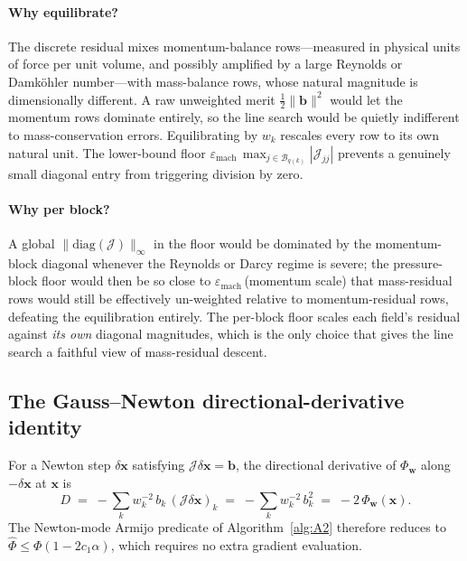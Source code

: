 \documentclass{article}
\begin{document}
\paragraph{Why equilibrate?}  The discrete residual mixes momentum-balance
rows---measured in physical units of force per unit volume, and possibly
amplified by a large Reynolds or Damk\"ohler number---with mass-balance
rows, whose natural magnitude is dimensionally different. A raw unweighted
merit $\tfrac{1}{2}\|\boldsymbol{b}\|^2$ would let the momentum rows
dominate entirely, so the line search would be quietly indifferent to
mass-conservation errors. Equilibrating by $w_k$ rescales every row to
its own natural unit. The lower-bound floor
$\varepsilon_{\mathrm{mach}}\,\max_{j \in \mathcal{B}_{q(k)}} |\mathcal{J}_{jj}|$
prevents a genuinely small diagonal entry from triggering division by
zero.

\paragraph{Why per block?}  A global $\|\mathrm{diag}(\mathcal{J})\|_\infty$
in the floor would be dominated by the momentum-block diagonal whenever
the Reynolds or Darcy regime is severe; the pressure-block floor
would then be so close to $\varepsilon_{\mathrm{mach}}\,$(momentum scale)
that mass-residual rows would still be effectively un-weighted relative
to momentum-residual rows, defeating the equilibration entirely. The
per-block floor scales each field's residual against \emph{its own}
diagonal magnitudes, which is the only choice that gives the line search
a faithful view of mass-residual descent.

\subsection{The Gauss--Newton directional-derivative identity}
\label{sec:dir-deriv}

For a Newton step $\delta\boldsymbol{x}$ satisfying
$\mathcal{J}\delta\boldsymbol{x} = \boldsymbol{b}$, the directional
derivative of $\Phi_{\boldsymbol{w}}$ along $-\delta\boldsymbol{x}$ at
$\boldsymbol{x}$ is
\begin{equation}
    \label{eq:dir-deriv}
    D \;=\; -\sum_k w_k^{-2}\, b_k\,(\mathcal{J}\delta\boldsymbol{x})_k
        \;=\; -\sum_k w_k^{-2}\, b_k^2
        \;=\; -2\,\Phi_{\boldsymbol{w}}(\boldsymbol{x}).
\end{equation}
The Newton-mode Armijo predicate of Algorithm~\ref{alg:A2} therefore
reduces to $\hat\Phi \le \Phi(1 - 2 c_1 \alpha)$, which requires no extra
gradient evaluation.
\end{document}
